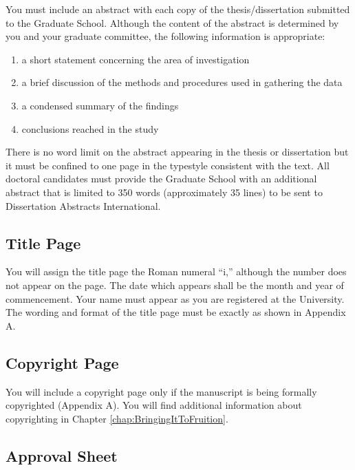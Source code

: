 You must include an abstract with each copy of the
the\-sis/dis\-ser\-ta\-tion submitted to the Graduate School. Although
the content of the abstract is determined by you and your graduate
committee, the following information is appropriate:

\begin{enumerate}
\item a short statement concerning the area of investigation
\item a brief discussion of the methods and procedures used in
  gathering the data
\item a condensed summary of the findings
\item conclusions reached in the study
\end{enumerate}

There is no word limit on the abstract appearing in the thesis or
dissertation but it must be confined to one page in the typestyle
consistent with the text. All doctoral candidates must provide the
Graduate School with an additional abstract that is limited to 350
words (approximately 35 lines) to be sent to Dissertation Abstracts
International.

\subsection{Title Page}
\label{sec:TitlePage}

You will assign the title page the Roman numeral ``i,'' although the
number does not appear on the page. The date which appears shall be
the month and year of commencement. Your name must appear as you are
registered at the University. The wording and format of the title page
must be exactly as shown in Appendix A.

\subsection{Copyright Page}
\label{sec:CopyrightPage}

You will include a copyright page only if the manuscript is being
formally copyrighted (Appendix A). You will find additional
information about copyrighting in Chapter
\ref{chap:BringingItToFruition}.

\subsection{Approval Sheet}
\label{sec:ApprovalSheet}

